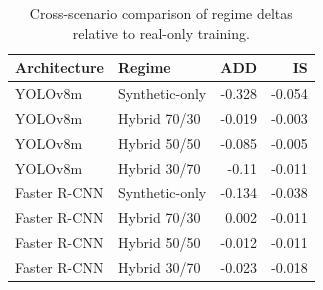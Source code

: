 \begin{table}
\caption{Cross-scenario comparison of regime deltas relative to real-only training.}
\label{tab:scale_delta_comparison}
\begin{tabular}{llrr}
\toprule
Architecture & Regime & ADD & IS \\
\midrule
YOLOv8m & Synthetic-only & -0.328 & -0.054 \\
YOLOv8m & Hybrid 70/30 & -0.019 & -0.003 \\
YOLOv8m & Hybrid 50/50 & -0.085 & -0.005 \\
YOLOv8m & Hybrid 30/70 & -0.11 & -0.011 \\
Faster R-CNN & Synthetic-only & -0.134 & -0.038 \\
Faster R-CNN & Hybrid 70/30 & 0.002 & -0.011 \\
Faster R-CNN & Hybrid 50/50 & -0.012 & -0.011 \\
Faster R-CNN & Hybrid 30/70 & -0.023 & -0.018 \\
\bottomrule
\end{tabular}
\end{table}
